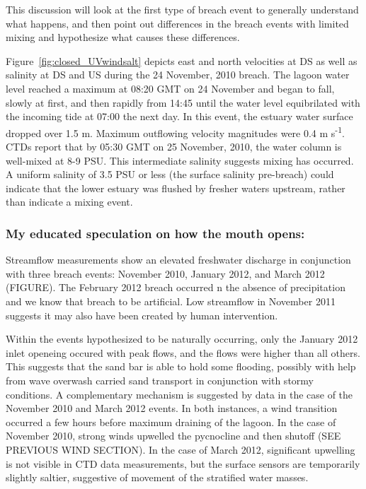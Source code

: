 This discussion will look at the first type of breach event to generally understand what happens, and then point out differences in the breach events with limited mixing and hypothesize what causes these differences. 

Figure~\ref{fig:closed_UVwindsalt} depicts east and north velocities at DS as well as salinity at DS and US during the 24 November, 2010 breach. The lagoon water level reached a maximum at 08:20 GMT on 24 November and began to fall, slowly at first, and then rapidly from 14:45 until the water level equibrilated with the incoming tide at 07:00 the next day. In this event, the estuary water surface dropped over 1.5 m. Maximum outflowing velocity magnitudes were 0.4 m s\textsuperscript{-1}. CTDs report that by 05:30 GMT on 25 November, 2010, the water column is well-mixed at 8-9 PSU. This intermediate salinity suggests mixing has occurred. A uniform salinity of 3.5 PSU or less (the surface salinity pre-breach) could indicate that the lower estuary was flushed by fresher waters upstream, rather than indicate a mixing event.


\subsubsection{My educated speculation on how the mouth opens:}
Streamflow measurements show an elevated freshwater discharge in conjunction with three breach events: November 2010, January 2012, and March 2012 (FIGURE). The February 2012 breach occurred n the absence of precipitation and we know that breach to be artificial. Low streamflow in November 2011 suggests it may also have been created by human intervention. 

Within the events hypothesized to be naturally occurring, only the January 2012 inlet openeing occured with peak flows, and the flows were higher than all others. This suggests that the sand bar is able to hold some flooding, possibly with help from wave overwash carried sand transport in conjunction with stormy conditions.  A complementary mechanism is suggested by data in the case of the November 2010 and March 2012 events. In both instances, a wind transition occurred a few hours before maximum draining of the lagoon. In the case of November 2010, strong winds upwelled the pycnocline and then shutoff (SEE PREVIOUS WIND SECTION). In the case of March 2012, significant upwelling is not visible in CTD data measurements, but the surface sensors are temporarily slightly saltier, suggestive of movement of the stratified water masses. 

